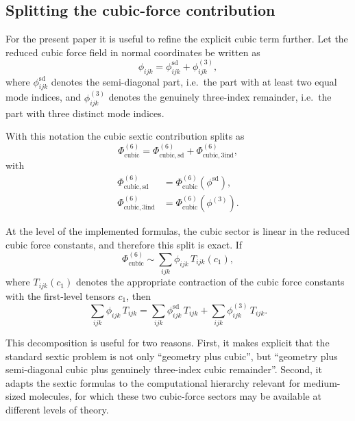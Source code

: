\subsection{Splitting the cubic-force contribution}

For the present paper it is useful to refine the explicit cubic term further.
Let the reduced cubic force field in normal coordinates be written as
\begin{equation}
\phi_{ijk}
=
\phi^{\mathrm{sd}}_{ijk}
+
\phi^{(3)}_{ijk},
\label{eq:app_phi3_split}
\end{equation}
where $\phi^{\mathrm{sd}}_{ijk}$ denotes the semi-diagonal part, i.e.\ the
part with at least two equal mode indices, and $\phi^{(3)}_{ijk}$ denotes the
genuinely three-index remainder, i.e.\ the part with three distinct mode
indices.

With this notation the cubic sextic contribution splits as
\begin{equation}
\Phi^{(6)}_{\mathrm{cubic}}
=
\Phi^{(6)}_{\mathrm{cubic,sd}}
+
\Phi^{(6)}_{\mathrm{cubic,3ind}},
\label{eq:app_sextic_cubic_split}
\end{equation}
with
\begin{align}
\Phi^{(6)}_{\mathrm{cubic,sd}}
&=
\Phi^{(6)}_{\mathrm{cubic}}(\phi^{\mathrm{sd}}),
\\
\Phi^{(6)}_{\mathrm{cubic,3ind}}
&=
\Phi^{(6)}_{\mathrm{cubic}}(\phi^{(3)}).
\end{align}

At the level of the implemented formulas, the cubic sector is linear in the
reduced cubic force constants, and therefore this split is exact. If
\begin{equation}
\Phi^{(6)}_{\mathrm{cubic}}
\sim
\sum_{ijk}\phi_{ijk}\,T_{ijk}(c_1),
\end{equation}
where $T_{ijk}(c_1)$ denotes the appropriate contraction of the cubic force
constants with the first-level tensors $c_1$, then
\begin{equation}
\sum_{ijk}\phi_{ijk}\,T_{ijk}
=
\sum_{ijk}\phi^{\mathrm{sd}}_{ijk}\,T_{ijk}
+
\sum_{ijk}\phi^{(3)}_{ijk}\,T_{ijk}.
\label{eq:app_sextic_cubic_linear_split}
\end{equation}

This decomposition is useful for two reasons. First, it makes explicit that
the standard sextic problem is not only ``geometry plus cubic'', but
``geometry plus semi-diagonal cubic plus genuinely three-index cubic
remainder''. Second, it adapts the sextic formulas to the computational
hierarchy relevant for medium-sized molecules, for which these two cubic-force
sectors may be available at different levels of theory.

